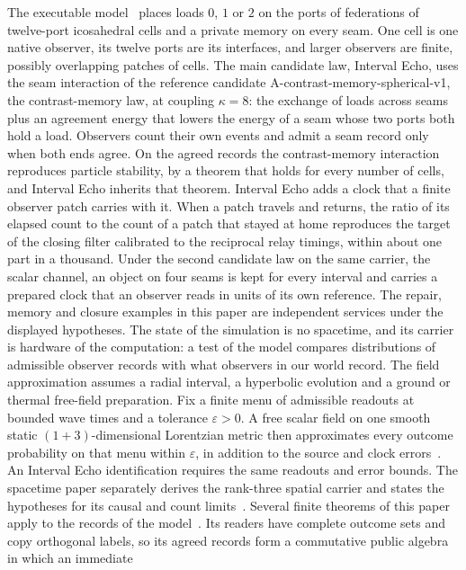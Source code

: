 \documentclass[11pt]{article}
\begin{document}
The executable model~\cite{ophmodel} places loads $0$, $1$ or $2$ on the
ports of federations of twelve-port icosahedral cells and a private memory
on every seam. One cell is one native observer, its twelve ports are its
interfaces, and larger observers are finite, possibly overlapping patches of
cells. The main candidate law, Interval Echo, uses the seam interaction of
the reference candidate A-contrast-memory-spherical-v1, the contrast-memory
law, at coupling $\kappa=8$: the exchange of loads across seams plus an
agreement energy that lowers the energy of a seam whose two ports both hold
a load. Observers count their own events and admit a seam record only when
both ends agree. On the agreed records the contrast-memory interaction
reproduces particle stability, by a theorem that holds for every number of
cells, and Interval Echo inherits that theorem. Interval Echo adds a clock
that a finite observer patch carries with it. When a patch travels and
returns, the ratio of its elapsed count to the count of a patch that stayed
at home reproduces the target of the closing filter calibrated to the reciprocal relay timings, within about one part in a thousand.
Under the second candidate law on the same carrier, the scalar channel, an
object on four seams is kept for every interval and carries a prepared clock
that an observer reads in units of its own reference. The repair, memory and
closure examples in this paper are independent services under the displayed
hypotheses. The state of the
simulation is no spacetime, and its carrier is hardware of the computation:
a test of the model compares distributions of admissible observer records
with what observers in our world record. The field approximation assumes
a radial interval, a hyperbolic evolution and a ground or thermal free-field
preparation. Fix a finite menu of admissible readouts at bounded wave times
and a tolerance $\varepsilon>0$. A free scalar field on one smooth static
$(1+3)$-dimensional Lorentzian metric then approximates every outcome
probability on that menu within $\varepsilon$, in addition to the source
and clock errors~\cite{ophsynthesis,ophEinstein}. An Interval Echo identification requires the same readouts and error bounds. The spacetime paper separately derives the
rank-three spatial carrier and states the hypotheses for its causal and
count limits~\cite{ophEinstein}. Several finite
theorems of this paper apply to the records of the model~\cite{ophmodel}.
Its readers have complete outcome sets and copy orthogonal labels, so its
agreed records form a commutative public algebra in which an immediate
\end{document}
